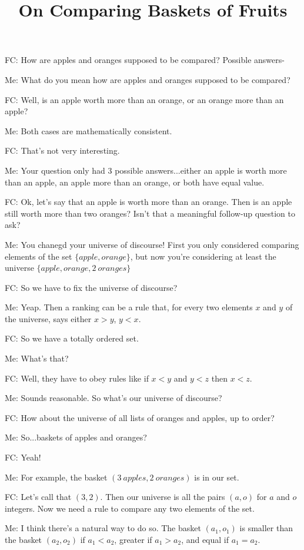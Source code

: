 \documentclass[a4paper,12pt]{article}
\title{On Comparing Baskets of Fruits}
\date{}
\begin{document}
\setlength{\parindent}{0cm}

FC: How are apples and oranges supposed to be compared? Possible answers-

Me: What do you mean how are apples and oranges supposed to be compared?

FC: Well, is an apple worth more than an orange, or an orange more than an apple?

Me: Both cases are mathematically consistent.

FC: That's not very interesting.

Me: Your question only had 3 possible answers...either an apple is worth more than an apple, an apple more than an orange, or both have equal value.

FC: Ok, let's say that an apple is worth more than an orange. Then is an apple still worth more than two oranges? Isn't that a meaningful follow-up question to ask?

Me: You chanegd your universe of discourse! First you only considered comparing elements of the set $\{apple, orange\}$, but now you're considering at least the universe $\{apple, orange, 2\ oranges\}$

FC: So we have to fix the universe of discourse?

Me: Yeap. Then a ranking can be a rule that, for every two elements $x$ and $y$ of the universe, says either $x > y$, $y < x$.

FC: So we have a totally ordered set.

Me: What's that?

FC: Well, they have to obey rules like if $x < y$ and $y < z$ then $x < z$.

Me: Sounds reasonable. So what's our universe of discourse?

FC: How about the universe of all lists of oranges and apples, up to order?

Me: So...baskets of apples and oranges?

FC: Yeah!

Me: For example, the basket $(3\ apples, 2\ oranges)$ is in our set.

FC: Let's call that $(3, 2)$. Then our universe is all the pairs $(a, o)$ for $a$ and $o$ integers. Now we need a rule to compare any two elements of the set.

Me: I think there's a natural way to do so. The basket $(a_1, o_1)$ is smaller than the basket $(a_2, o_2)$ if $a_1 < a_2$, greater if $a_1 > a_2$, and equal if $a_1 = a_2$.
\end{document}
